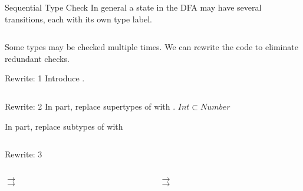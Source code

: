 \begin{frame}{Sequential Type Check}
  In general a state in the DFA may have several transitions, each with its own type label.
  \begin{columns}
    \begin{column}{0.5\textwidth}
      \usebox\typecaseAbox
    \end{column}
    \begin{column}{0.5\textwidth}  %
      \scalebox{0.9}{}
    \end{column}    
  \end{columns}

  Some types may be checked multiple times.  We can rewrite the code to eliminate redundant checks.

\end{frame}


\begin{frame}{Rewrite: 1}
  Introduce .

  \begin{columns}
    \begin{column}{0.5\textwidth}
      \usebox\typecaseAbox
    \end{column}
    \begin{column}{0.5\textwidth}  %
      \usebox\typecaseBbox
    \end{column}    
  \end{columns}
\end{frame}

\begin{frame}{Rewrite: 2}
  In  part, replace supertypes of  with .  $Int\subset Number$
  
  In  part, replace subtypes of  with 

  \begin{columns}
    \begin{column}{0.5\textwidth}
      \usebox\typecaseBbox
    \end{column}
    \begin{column}{0.5\textwidth}  %
      \usebox\typecaseCbox
    \end{column}    
  \end{columns}
\end{frame}

\begin{frame}{Rewrite: 3}
  \begin{columns}
    \begin{column}{0.5\textwidth}
       $\to$ \\
       $\to$ 
      
      \usebox\typecaseCbox
    \end{column}
    \begin{column}{0.5\textwidth}  %
       $\to$ \\
       $\to$ 

      \usebox\typecaseDbox
    \end{column}    
  \end{columns}
\end{frame}

